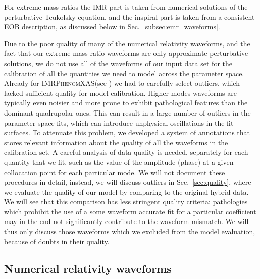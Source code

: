 \documentclass[twocolumn,prd,aps,superscriptaddress,preprintnumbers,tightenlines,showpacs,nofootinbib,eqsecnum,amsfonts,amsmath]{revtex4}
\newcommand{\phX}{\textsc{IMRPhenomXAS}\xspace}
\begin{document}
For extreme mass ratios the IMR part is taken from
numerical solutions of the perturbative Teukolsky
equation, and the inspiral part is taken from a consistent EOB description, as discussed below in
Sec.~\ref{subsec:emr_waveforms}.

Due to the poor quality of many of the numerical relativity waveforms, and the fact that our extreme mass ratio waveforms are only approximate perturbative solutions, we do not use all of the waveforms of our input data set for the calibration of all the quantities we need to
model across the parameter space. Already for
\phX (see \cite{phenX}) we had to carefully select outliers, which lacked sufficient quality for model calibration. Higher-modes waveforms are typically even noisier and more prone to exhibit pathological features than the dominant quadrupolar ones. This can result in a large number of outliers in the parameter-space fits, which can introduce unphysical oscillations in the fit surfaces.  To attenuate this problem, we developed a system of annotations that stores relevant information about the quality of all the waveforms in the calibration set. 
A careful analysis of data quality is needed, separately for each quantity that we fit, such as the value of the amplitude (phase) at a given collocation point for each particular mode. We will not document these procedures in detail, instead, we will discuss outliers in Sec.~\ref{sec:quality}, where we evaluate the quality of our model by comparing to the original hybrid data. We will see that this comparison has less stringent quality criteria: pathologies which prohibit the use of a some waveform accurate fit for a particular coefficient may in the end not significantly contribute to the waveform mismatch. We will thus only discuss those waveforms which we excluded from
the model evaluation, because of doubts in their quality.


\subsection{Numerical relativity waveforms} \label{subsec:nr_waveforms}
\end{document}
